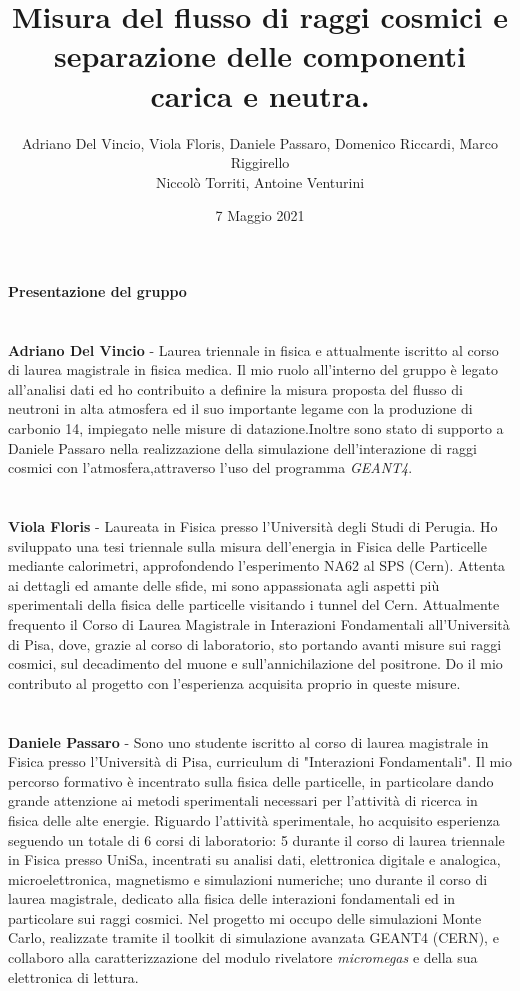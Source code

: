 \documentclass{article}
\title{\textbf{Misura del flusso di raggi cosmici e separazione delle componenti carica e neutra.}}
\author{Adriano Del Vincio, Viola Floris, Daniele Passaro, Domenico Riccardi, Marco Riggirello
\\
Niccolò Torriti, Antoine Venturini}
\date{7 Maggio 2021}
\begin{document}
\maketitle
\begin{center}
\textbf{\Large Presentazione del gruppo}
\end{center}

\section*{}
\textbf{Adriano Del Vincio} - Laurea triennale in fisica e attualmente iscritto al corso di laurea magistrale in fisica medica. Il mio ruolo all'interno del gruppo è legato all'analisi dati ed ho contribuito a definire la misura proposta del flusso di neutroni in alta atmosfera ed il suo importante legame con la produzione di carbonio 14, impiegato nelle misure di datazione.Inoltre sono stato di supporto a Daniele Passaro nella realizzazione della simulazione dell'interazione di raggi cosmici con l'atmosfera,attraverso l'uso del programma \textit{GEANT4}. 

\section*{}
\textbf{Viola Floris} - Laureata in Fisica presso l'Università degli Studi di Perugia. Ho sviluppato una tesi triennale sulla misura dell'energia in Fisica delle Particelle mediante calorimetri, approfondendo l'esperimento NA62 al SPS (Cern). Attenta ai dettagli ed amante delle sfide, mi sono appassionata agli aspetti più sperimentali della fisica delle particelle visitando i tunnel del Cern. Attualmente frequento il Corso di Laurea Magistrale in Interazioni Fondamentali all'Università di Pisa, dove, grazie al corso di laboratorio, sto portando avanti misure sui raggi cosmici, sul decadimento del muone e sull'annichilazione del positrone. Do il mio contributo al progetto con l'esperienza acquisita proprio in queste misure.

\section*{}
\textbf{Daniele Passaro} - Sono uno studente iscritto al corso di laurea magistrale in Fisica presso l'Università di Pisa, curriculum di  "Interazioni Fondamentali". 
Il mio percorso formativo è incentrato sulla fisica delle particelle, in particolare dando grande attenzione ai metodi sperimentali necessari per l'attività di ricerca in fisica delle alte energie. Riguardo l'attività sperimentale, ho acquisito esperienza seguendo un totale di 6 corsi di laboratorio: 5 durante il corso di laurea triennale in Fisica presso UniSa, incentrati su analisi dati, elettronica digitale e analogica, microelettronica, magnetismo e simulazioni numeriche; uno durante il corso di laurea magistrale, dedicato alla fisica delle interazioni fondamentali ed in particolare sui raggi cosmici.
Nel progetto mi occupo delle simulazioni Monte Carlo, realizzate tramite il toolkit di simulazione avanzata GEANT4 (\textcopyright CERN), e collaboro alla caratterizzazione del modulo rivelatore \emph{micromegas} e della sua elettronica di lettura. 
\end{document}
